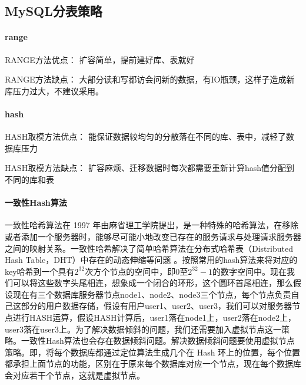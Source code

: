 \documentclass[../../../interview-questions.tex]{subfiles}
\begin{document}
\subsection{MySQL分表策略}

\paragraph{range}

RANGE方法优点： 扩容简单，提前建好库、表就好

RANGE方法缺点： 大部分读和写都访会问新的数据，有IO瓶颈，这样子造成新库压力过大，不建议采用。

\paragraph{hash}

HASH取模方法优点： 能保证数据较均匀的分散落在不同的库、表中，减轻了数据库压力

HASH取模方法缺点： 扩容麻烦、迁移数据时每次都需要重新计算hash值分配到不同的库和表

\paragraph{一致性Hash算法}

一致性哈希算法在 1997 年由麻省理工学院提出，是一种特殊的哈希算法，在移除或者添加一个服务器时，能够尽可能小地改变已存在的服务请求与处理请求服务器之间的映射关系。一致性哈希解决了简单哈希算法在分布式哈希表（Distributed Hash Table，DHT）中存在的动态伸缩等问题 。按照常用的hash算法来将对应的key哈希到一个具有$2^{32}$次方个节点的空间中，即0至$ 2^{32}-1$的数字空间中。现在我们可以将这些数字头尾相连，想象成一个闭合的环形，这个圆环首尾相连，那么假设现在有三个数据库服务器节点node1、node2、node3三个节点，每个节点负责自己这部分的用户数据存储，假设有用户user1、user2、user3，我们可以对服务器节点进行HASH运算，假设HASH计算后，user1落在node1上，user2落在node2上，user3落在user3上。为了解决数据倾斜的问题，我们还需要加入虚拟节点这一策略。一致性Hash算法也会存在数据倾斜问题。解决数据倾斜问题要使用虚拟节点策略。即，将每个数据库都通过定位算法生成几个在 Hash 环上的位置，每个位置都承担上面节点的功能，区别在于原来每个数据库对应一个节点，现在每个数据库会对应若干个节点，这就是虚拟节点。
\end{document}
